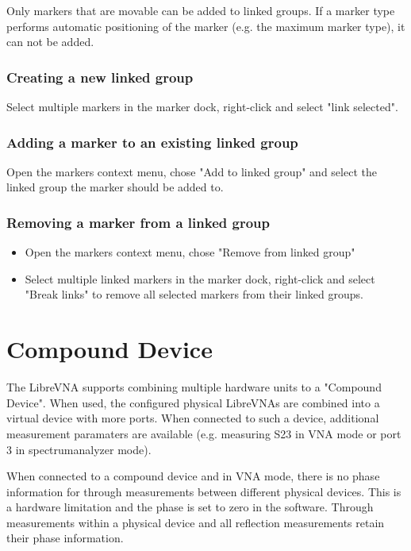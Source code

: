 \documentclass[a4paper,11pt]{article}
\newcommand\danger[1][5ex]{%
  \renewcommand\stacktype{L}%
  \scaleto{\stackon[1.3pt]{\color{red}$\triangle$}{\tiny !}}{#1}%
}
\newenvironment{important}[1][]{%
   \begin{mdframed}[%
      backgroundcolor={red!15}, hidealllines=true,
      skipabove=0.7\baselineskip, skipbelow=0.7\baselineskip,
      splitbottomskip=2pt, splittopskip=4pt, #1]%
   \makebox[0pt]{%
      \smash{%
         \hspace*{-45pt}%
         \raisebox{-5pt}{%
            {\danger}%
         }%
      }%
   }%
}{\end{mdframed}}
\begin{document}
Only markers that are movable can be added to linked groups. If a marker type performs automatic positioning of the marker (e.g. the maximum marker type), it can not be added.

\subsubsection{Creating a new linked group}
Select multiple markers in the marker dock, right-click and select "link selected".
\subsubsection{Adding a marker to an existing linked group}
Open the markers context menu, chose "Add to linked group" and select the linked group the marker should be added to.
\subsubsection{Removing a marker from a linked group}
\begin{itemize}
\item Open the markers context menu, chose "Remove from linked group"
\item Select multiple linked markers in the marker dock, right-click and select "Break links" to remove all selected markers from their linked groups.
\end{itemize}

\section{Compound Device}
The LibreVNA supports combining multiple hardware units to a "Compound Device". When used, the configured physical LibreVNAs are combined into a virtual device with more ports. When connected to such a device, additional measurement paramaters are available (e.g. measuring S23 in VNA mode or port 3 in spectrumanalyzer mode).

\begin{important}
When connected to a compound device and in VNA mode, there is no phase information for through measurements between different physical devices. This is a hardware limitation and the phase is set to zero in the software. Through measurements within a physical device and all reflection measurements retain their phase information.
\end{important}
\end{document}
